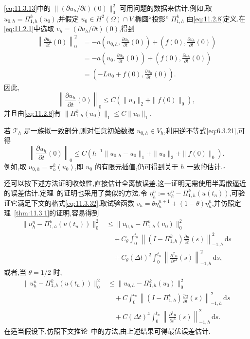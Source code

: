 \begin{note}
\eqref{eq:11.3.13}中的 \(\|(\partial u_h/\partial t)(0)\|_0^2\) 可用问题的数据来估计.例如,取 \(u_{0,h}=\Pi_{1,h}^k(u_0)\),并假定 \(u_0\in H^2(\Omega)\cap V\).椭圆“投影” \(\Pi_{1,h}^k\) 由\eqref{eq:11.2.8}定义.在\eqref{eq:11.2.1}中选取 \(v_h=(\partial u_h/\partial t)(0)\),得到
\[
  \begin{aligned}
    \left\|\frac{\partial u_h}{\partial t}(0)\right\|_0^2
      &=-a\left(u_{0,h},\frac{\partial u_h}{\partial t}(0)\right)
            +\left(f(0),\frac{\partial u_h}{\partial t}(0)\right)\\
      &=-a\left(u_0,\frac{\partial u_h}{\partial t}(0)\right)
            +\left(f(0),\frac{\partial u_h}{\partial t}(0)\right)\\
      &=\left(-Lu_0+f(0),\frac{\partial u_h}{\partial t}(0)\right).
  \end{aligned}
\]
因此,
\[
  \left\|\frac{\partial u_h}{\partial t}(0)\right\|_0\le C(\|u_0\|_2+\|f(0)\|_0),
\]
并且由\eqref{eq:11.2.8}有 \(\|\Pi_{1,h}^k(u_0)\|_1\le C\|u_0\|_1\).

若 \(\mathcal T_h\) 是一族拟一致剖分,则对任意初始数据 \(u_{0,h}\in V_h\),利用逆不等式\eqref{eq:6.3.21},可得
\[
  \left\|\frac{\partial u_h}{\partial t}(0)\right\|_0
       \le C(h^{-1}\|u_{0,h}-u_0\|_1+\|u_0\|_2+\|f(0)\|_0).
\]
例如,取 \(u_{0,h}=\pi_h^k(u_0)\),即 \(u_0\) 的有限元插值,仍可得到关于 \(h\) 一致的估计.\hfill\(\square\)
\end{note}

还可以按下述方法证明收敛性,直接估计全离散误差.这一证明无需使用半离散逼近的误差估计.定理~的证明也采用了类似的方法.令 \(\eta_h^n:=u_h^n-\Pi_{1,h}^k(u(t_n))\),可验证它满足下文的格式\eqref{eq:11.3.32}.取试验函数 \(v_h=\theta\eta_h^{n+1}+(1-\theta)\eta_h^n\),并仿照定理~\ref{thm:11.3.1}的证明,容易得到
\[
  \begin{aligned}
    \|u_h^n-\Pi_{1,h}^k(u(t_n))\|_0^2
       &\le\|u_{0,h}-\Pi_{1,h}^k(u_0)\|_0^2\\
       &\quad+C_\theta\int_0^{t_n}
           \left\|(I-\Pi_{1,h}^k)\frac{\partial u}{\partial t}(s)\right\|_{-1,h}^2\,\mathrm ds\\
       &\quad+C_\theta(\Delta t)^2\int_0^{t_n}
           \left\|\frac{\partial^2u}{\partial t^2}(s)\right\|_{-1,h}^2\,\mathrm ds,
  \end{aligned}
\]
或者,当 \(\theta=1/2\) 时,
\[
  \begin{aligned}
    \|u_h^n-\Pi_{1,h}^k(u(t_n))\|_0^2
       &\le\|u_{0,h}-\Pi_{1,h}^k(u_0)\|_0^2\\
       &\quad+C\int_0^{t_n}\left\|(I-\Pi_{1,h}^k)
                   \frac{\partial u}{\partial t}(s)\right\|_{-1,h}^2\,\mathrm ds\\
       &\quad+C(\Delta t)^4\int_0^{t_n}
                   \left\|\frac{\partial^3u}{\partial t^3}(s)\right\|_{-1,h}^2\,\mathrm ds.
  \end{aligned}
\]
在适当假设下,仿照下文推论~中的方法,由上述结果可得最优误差估计.

